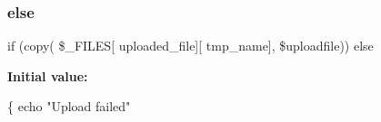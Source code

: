 \mbox{\label{upload_8php_ae21bfb0938e98c971932ffffac17aac3}} 
\subsubsection{\texorpdfstring{else}{else}}
{\footnotesize\ttfamily if (copy( \$\+\_\+\+F\+I\+L\+ES\mbox{[} \textquotesingle{}uploaded\+\_\+file\textquotesingle{}\mbox{]}\mbox{[} \textquotesingle{}tmp\+\_\+name\textquotesingle{}\mbox{]}, \$uploadfile)) else}

{\bfseries Initial value\+:}
\begin{DoxyCode}
\{
       echo \textcolor{stringliteral}{"Upload failed"}
\end{DoxyCode}

